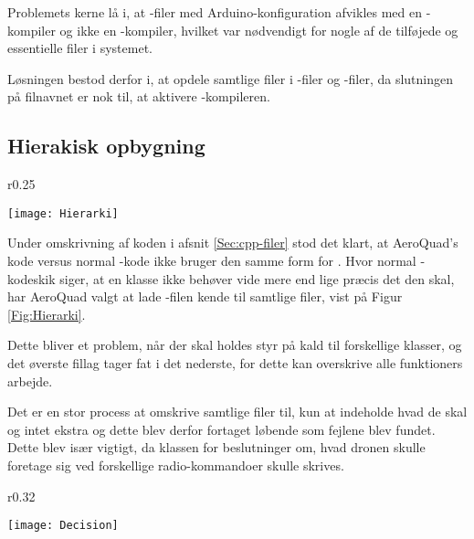 \documentclass[Main]{subfiles}
\begin{document}
Problemets kerne lå i, at -filer med Arduino-konfiguration afvikles med en -kompiler og ikke en -kompiler, hvilket var nødvendigt for nogle af de tilføjede og essentielle filer i systemet.

Løsningen bestod derfor i, at opdele samtlige filer i -filer og -filer, da slutningen på filnavnet er nok til, at aktivere -kompileren.



\subsection{Hierakisk opbygning}

\begin{wrapfigure}{r}{0.25\textwidth}
  \vspace{-20pt}
  \begin{center}
	\texttt{[image: Hierarki]}
  \end{center}
  \vspace{-20pt}
  \caption{AeroQuad's opbygning.}
  \label{Fig:Hierarki}
  \vspace{-20pt}
\end{wrapfigure}

Under omskrivning af koden i afsnit \ref{Sec:cpp-filer} stod det klart, at Aero\-Quad's kode versus normal -kode ikke bruger den samme form for .
Hvor normal -kodeskik siger, at en klasse ikke behøver vide mere end lige præcis det den skal, har AeroQuad valgt at lade -filen kende til samtlige filer, vist på Figur \ref{Fig:Hierarki}.

Dette bliver et problem, når der skal holdes styr på kald til forskellige klasser, og det øverste fillag tager fat i det nederste, for dette kan overskrive alle funktioners arbejde.

Det er en stor process at omskrive samtlige filer til, kun at indeholde hvad de skal og intet ekstra og dette blev derfor fortaget løbende som fejlene blev fundet.
Dette blev især vigtigt, da klassen for beslutninger om, hvad dronen skulle foretage sig ved forskellige radio-kommandoer skulle skrives.


\begin{wrapfigure}{r}{0.32\textwidth}
  \vspace{-20pt}
  \begin{center}
	\texttt{[image: Decision]}
  \end{center}
  \vspace{-20pt}
  \caption{Beslutningstagning.}
  \label{Fig:Decision}
  \vspace{-30pt}
\end{wrapfigure}
\end{document}
